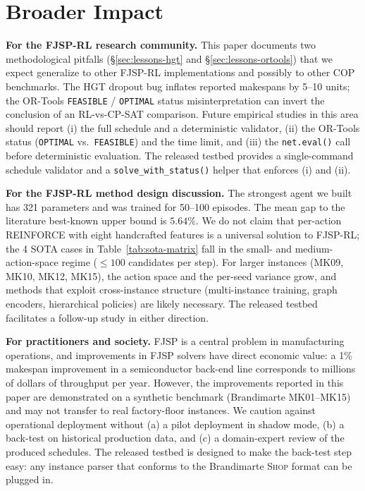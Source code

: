 \documentclass[10pt]{article}
\theoremstyle{definition}
\begin{document}
\section{Broader Impact}
\label{sec:impact}

\textbf{For the FJSP-RL research community.}
This paper documents two methodological pitfalls
(§\ref{sec:lessons-hgt} and §\ref{sec:lessons-ortools})
that we expect generalize to other FJSP-RL
implementations and possibly to other COP benchmarks.
The HGT dropout bug inflates reported makespans by
5--10 units; the OR-Tools \texttt{FEASIBLE} /
\texttt{OPTIMAL} status misinterpretation can invert
the conclusion of an RL-vs-CP-SAT comparison. Future
empirical studies in this area should report (i) the
full schedule and a deterministic validator, (ii) the
OR-Tools status (\texttt{OPTIMAL} vs.\ \texttt{FEASIBLE})
and the time limit, and (iii) the \texttt{net.eval()}
call before deterministic evaluation. The released
testbed provides a single-command schedule validator
and a \texttt{solve\_with\_status()} helper that
enforces (i) and (ii).

\textbf{For the FJSP-RL method design discussion.}
The strongest agent we built has 321 parameters and
was trained for 50--100 episodes. The mean gap to the
literature best-known upper bound is $5.64\%$. We do
not claim that per-action REINFORCE with eight
handcrafted features is a universal solution to
FJSP-RL; the 4 SOTA cases in
Table~\ref{tab:sota-matrix} fall in the small- and
medium-action-space regime ($\leq 100$ candidates per
step). For larger instances (MK09, MK10, MK12, MK15),
the action space and the per-seed variance grow, and
methods that exploit cross-instance structure
(multi-instance training, graph encoders, hierarchical
policies) are likely necessary. The released testbed
facilitates a follow-up study in either direction.

\textbf{For practitioners and society.}
FJSP is a central problem in manufacturing operations,
and improvements in FJSP solvers have direct economic
value: a 1\% makespan improvement in a semiconductor
back-end line corresponds to millions of dollars of
throughput per year. However, the improvements reported
in this paper are demonstrated on a synthetic benchmark
(Brandimarte MK01--MK15) and may not transfer to real
factory-floor instances. We caution against operational
deployment without (a) a pilot deployment in shadow
mode, (b) a back-test on historical production data,
and (c) a domain-expert review of the produced
schedules. The released testbed is designed to make
the back-test step easy: any instance parser that
conforms to the Brandimarte \textsc{Shop} format can
be plugged in.
\end{document}
